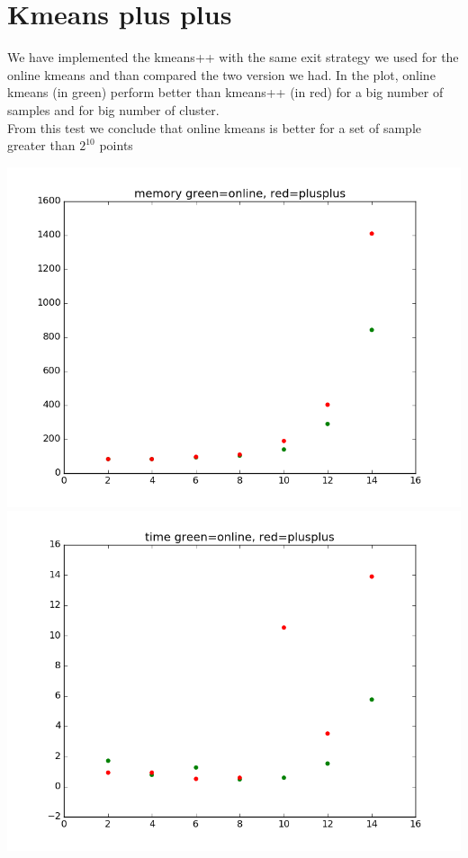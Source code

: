 \documentclass[12pt]{article}
\begin{document}
  
  
\section{Kmeans plus plus}
We have implemented the kmeans++ with the same exit strategy we used for the online kmeans and than compared the two version we had. In the plot, online kmeans (in green) perform better than kmeans++ (in red) for a big number of samples and for big number of cluster. \\
From this test we conclude that online kmeans is better for a set of sample greater than $2^10$ points

  
  
\begin{table}
\includegraphics[scale=0.4]{memoryComparison.png}
\includegraphics[scale=0.4]{timeComparison.png}
  \end{table}



  
\end{document}
